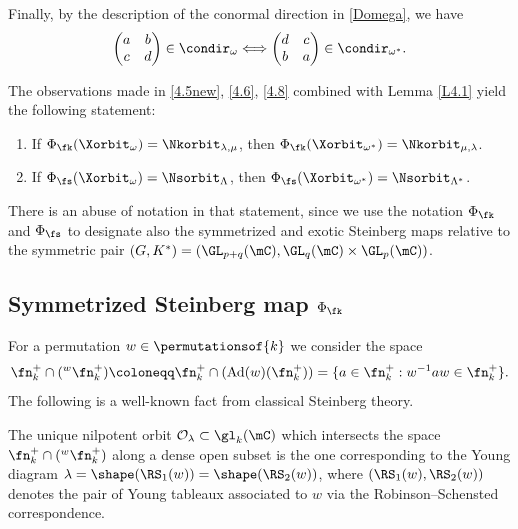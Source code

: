 Finally, by the description of the conormal direction in \eqref{Domega}, we have
\begin{equation}
\label{4.8}
\begin{pmatrix} a & b\\ c & d \end{pmatrix}\in\condir_\omega\Longleftrightarrow
\begin{pmatrix} d & c\\ b & a \end{pmatrix}\in\condir_{\omega^*}.
\end{equation}

The observations made in \eqref{4.5new}, \eqref{4.6}, \eqref{4.8} combined with Lemma \ref{L4.1} yield the following statement:

\begin{lemma}
\label{L4.3}
\begin{enumerate}
\item If $\Phi_\fk(\Xorbit_\omega)=\Nkorbit_{\lambda,\mu}$, then $\Phi_\fk(\Xorbit_{\omega^*})=\Nkorbit_{\mu,\lambda}$.
\item If $\Phi_\fs(\Xorbit_\omega)=\Nsorbit_\Lambda$, then $\Phi_\fs(\Xorbit_{\omega^*})=\Nsorbit_{\Lambda^*}$.
\end{enumerate}
\end{lemma}

There is an abuse of notation in that statement, since we use the notation $\Phi_\fk$ and $\Phi_\fs$ to designate also the symmetrized and exotic Steinberg maps relative to the symmetric pair $(G,K^*)=(\GL_{p+q}(\mC),\GL_q(\mC)\times\GL_p(\mC))$.

\subsection{Symmetrized Steinberg map $\Phi_\fk$}

For a permutation $w\in\permutationsof{k}$ we consider the space
\[
\fn_k^+\cap({}^w\fn_k^+)\coloneqq \fn_k^+\cap(\mathrm{Ad}(w)(\fn_k^+))=\{a\in\fn_k^+:w^{-1}aw\in\fn_k^+\}.
\]
The following is a well-known fact from classical Steinberg theory.

\begin{theorem}
\label{T-Steinberg}
The unique nilpotent orbit $\mathcal{O}_\lambda\subset \gl_k(\mC)$ which intersects the space $\fn_k^+\cap({}^w\fn_k^+)$ along a dense open subset is the one corresponding to the Young diagram
$\lambda=\shape(\RS_1(w))=\shape(\RS_2(w))$, where $(\RS_1(w),\RS_2(w))$ denotes the pair of Young tableaux associated to $w$ via the Robinson--Schensted correspondence.
\end{theorem}

